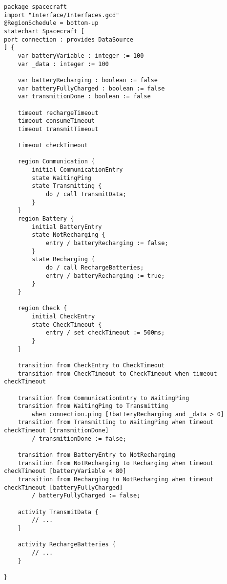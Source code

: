 \begin{lstlisting}[float,language=statechart, caption={The Gamma implementation of the Spacecraft component.}, label={}]
package spacecraft
import "Interface/Interfaces.gcd"
@RegionSchedule = bottom-up
statechart Spacecraft [
port connection : provides DataSource
] {
	var batteryVariable : integer := 100
	var _data : integer := 100
	
	var batteryRecharging : boolean := false
	var batteryFullyCharged : boolean := false
	var transmitionDone : boolean := false
	
	timeout rechargeTimeout
	timeout consumeTimeout
	timeout transmitTimeout
	
	timeout checkTimeout
	
	region Communication { 
		initial CommunicationEntry
		state WaitingPing
		state Transmitting {
			do / call TransmitData;
		}
	}
	region Battery {
		initial BatteryEntry
		state NotRecharging {
			entry / batteryRecharging := false;
		}
		state Recharging {
			do / call RechargeBatteries;
			entry / batteryRecharging := true;
		}
	}
	
	region Check {
		initial CheckEntry
		state CheckTimeout {
			entry / set checkTimeout := 500ms;
		}
	}
	
	transition from CheckEntry to CheckTimeout
	transition from CheckTimeout to CheckTimeout when timeout checkTimeout
	
	transition from CommunicationEntry to WaitingPing
	transition from WaitingPing to Transmitting 
		when connection.ping [!batteryRecharging and _data > 0]
	transition from Transmitting to WaitingPing when timeout checkTimeout [transmitionDone] 
		/ transmitionDone := false;
	
	transition from BatteryEntry to NotRecharging	
	transition from NotRecharging to Recharging when timeout checkTimeout [batteryVariable < 80]
	transition from Recharging to NotRecharging when timeout checkTimeout [batteryFullyCharged]
		/ batteryFullyCharged := false;
	
	activity TransmitData {		
		// ...
	}
	
	activity RechargeBatteries {
		// ...
	}
	
}
\end{lstlisting}
